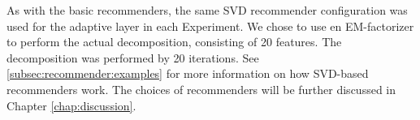 As with the basic recommenders, the same SVD recommender configuration was used 
for the adaptive layer in each Experiment.
We chose to use en EM-factorizer to perform the actual decomposition,
consisting of 20 features. The decomposition was performed by 20 iterations.
See \ref{subsec:recommender:examples} for more information on how SVD-based recommenders work. 
The choices of recommenders will be further discussed
in Chapter \ref{chap:discussion}.

